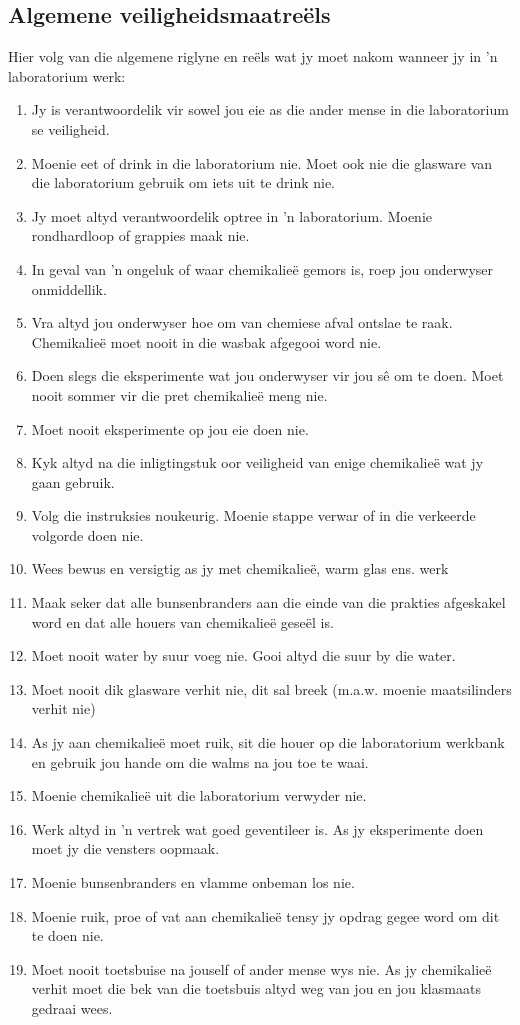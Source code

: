 \begin{table}[H]
\subsection*{Algemene veiligheidsmaatreëls}
            \nopagebreak
Hier volg van die algemene riglyne en reëls wat jy moet nakom wanneer jy in  'n laboratorium werk:
\begin{enumerate}[noitemsep, label=\textbf{\arabic*}. ] 
\item Jy is verantwoordelik vir sowel jou eie as die ander mense in die laboratorium se veiligheid.
\item Moenie eet of drink in die laboratorium nie. Moet ook nie die glasware van die laboratorium gebruik om iets uit te drink nie.
\item Jy moet altyd verantwoordelik optree in  'n laboratorium. Moenie rondhardloop of grappies maak nie.
\item In geval van  'n ongeluk of waar chemikalieë gemors is, roep jou onderwyser onmiddellik.
\item Vra altyd jou onderwyser hoe om van chemiese afval ontslae te raak. Chemikalieë moet nooit in die wasbak afgegooi word nie.
\item Doen slegs die eksperimente wat jou onderwyser vir jou sê om te doen. Moet nooit sommer vir die pret chemikalieë meng nie.
\item Moet nooit eksperimente op jou eie doen nie. 
\item Kyk altyd na die inligtingstuk oor veiligheid van enige chemikalieë wat jy gaan gebruik. 
\item Volg die instruksies noukeurig. Moenie stappe verwar of in die verkeerde volgorde doen nie. 
\item Wees bewus en versigtig as jy met chemikalieë, warm glas ens. werk  
\item Maak seker dat alle bunsenbranders aan die einde van die prakties afgeskakel word en dat alle houers van chemikalieë geseël is.
\item Moet nooit water by suur voeg nie. Gooi altyd die suur by die water.
\item Moet nooit dik glasware verhit nie, dit sal breek (m.a.w. moenie maatsilinders verhit nie)
\item As jy aan chemikalieë moet ruik, sit die houer op die laboratorium werkbank en gebruik jou hande om die walms na jou toe te waai.
\item Moenie chemikalieë uit die laboratorium verwyder nie.
\item Werk altyd in  'n vertrek wat goed geventileer is. As jy eksperimente doen moet jy die vensters oopmaak.
\item Moenie bunsenbranders en vlamme onbeman los nie.
\item Moenie ruik, proe of vat aan chemikalieë tensy jy opdrag gegee word om dit te doen nie.
\item Moet nooit toetsbuise na jouself of ander mense wys nie. As jy chemikalieë verhit moet die bek van die toetsbuis altyd weg van jou en jou klasmaats gedraai wees.
\end{enumerate}
\par 

\end{table}
